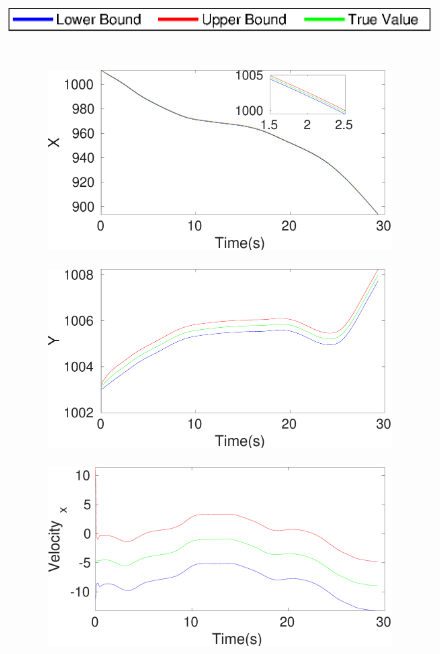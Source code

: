\begin{figure}[h]
\includegraphics[scale=0.8]{figures/legend}\\\\
\begin{subfigure}{.5\linewidth}
\centering
\includegraphics[width=\linewidth]{figures/Frad/s3caSMX}
\end{subfigure}
\begin{subfigure}{.5\linewidth}
\centering
\includegraphics[width=\linewidth]{figures/Frad/s3caSMY}
\end{subfigure}
\begin{subfigure}{.5\linewidth}
\centering
\includegraphics[width=\linewidth]{figures/Frad/s3caSMVelocity_x}

\end{subfigure}
\end{figure}
